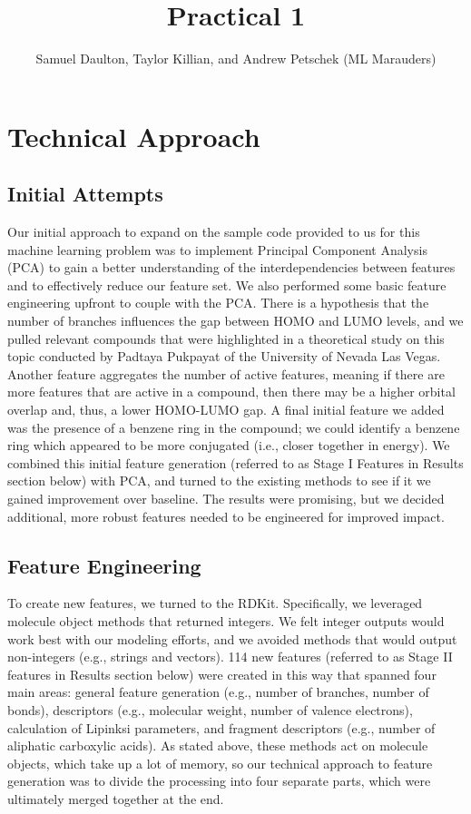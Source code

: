 \documentclass[11pt, oneside]{article}   	%
\title{Practical 1}
\author{Samuel Daulton, Taylor Killian, and Andrew Petschek (ML Marauders)}
\begin{document}
\maketitle
\section{Technical Approach}
\subsection{Initial Attempts} 


Our initial approach to expand on the sample code provided to us for this machine learning problem was to implement Principal Component Analysis (PCA) to gain a better understanding of the interdependencies between features and to effectively reduce our feature set. We also performed some basic feature engineering upfront to couple with the PCA. There is a hypothesis that the number of branches influences the gap between HOMO and LUMO levels, and we pulled relevant compounds that were highlighted in a theoretical study on this topic conducted by Padtaya Pukpayat of the University of Nevada Las Vegas. Another feature aggregates the number of active features, meaning if there are more features that are active in a compound, then there may be a higher orbital overlap and, thus, a lower HOMO-LUMO gap. A final initial feature we added was the presence of a benzene ring in the compound; we could identify a benzene ring which appeared to be more conjugated (i.e., closer together in energy). We combined this initial feature generation (referred to as Stage I Features in Results section below) with PCA, and turned to the existing methods to see if it we gained improvement over baseline. The results were promising, but we decided additional, more robust features needed to be engineered for improved impact. 

\subsection{Feature Engineering} 

To create new features, we turned to the RDKit. Specifically, we leveraged molecule object methods that returned integers. We felt integer outputs would work best with our modeling efforts, and we avoided methods that would output non-integers (e.g., strings and vectors). 114 new features (referred to as Stage II features in Results section below) were created in this way that spanned four main areas: general feature generation (e.g., number of branches, number of bonds), descriptors (e.g., molecular weight, number of valence electrons), calculation of Lipinksi parameters, and fragment descriptors (e.g., number of aliphatic carboxylic acids). As stated above, these methods act on molecule objects, which take up a lot of memory, so our technical approach to feature generation was to divide the processing into four separate parts, which were ultimately merged together at the end. 
\end{document}
